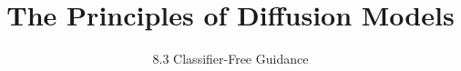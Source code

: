 
\title{The Principles of Diffusion Models}
\subtitle{8.3 Classifier-Free Guidance}


\begin{frame}
    \titlepage
\end{frame}



